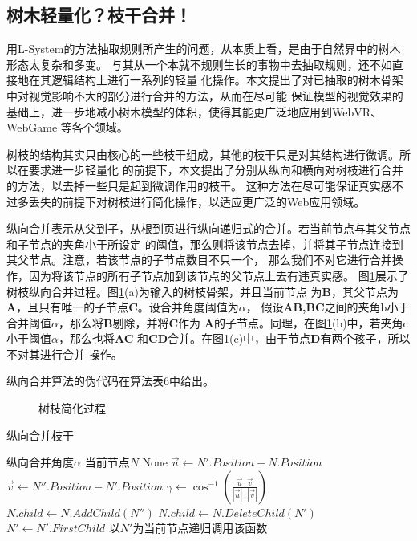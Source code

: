 \subsection{树木轻量化？枝干合并！}
\label{subsec:branchmerge}
用L-System的方法抽取规则所产生的问题，从本质上看，是由于自然界中的树木形态太复杂和多变。
与其从一个本就不规则生长的事物中去抽取规则，还不如直接地在其逻辑结构上进行一系列的轻量
化操作。本文提出了对已抽取的树木骨架中对视觉影响不大的部分进行合并的方法，从而在尽可能
保证模型的视觉效果的基础上，进一步地减小树木模型的体积，使得其能更广泛地应用到WebVR、WebGame
等各个领域。

树枝的结构其实只由核心的一些枝干组成，其他的枝干只是对其结构进行微调。所以在要求进一步轻量化
的前提下，本文提出了分别从纵向和横向对树枝进行合并的方法，以去掉一些只是起到微调作用的枝干。
这种方法在尽可能保证真实感不过多丢失的前提下对树枝进行简化操作，以适应更广泛的Web应用领域。

纵向合并表示从父到子，从根到页进行纵向递归式的合并。若当前节点与其父节点和子节点的夹角小于所设定
的阈值，那么则将该节点去掉，并将其子节点连接到其父节点。注意，若该节点的子节点数目不只一个，
那么我们不对它进行合并操作，因为将该节点的所有子节点加到该节点的父节点上去有违真实感。
图\ref{fig:vert}展示了树枝纵向合并过程。图\ref{fig:vert}(a)为输入的树枝骨架，并且当前节点
为\textbf{B}，其父节点为\textbf{A}，且只有唯一的子节点\textbf{C}。设合并角度阈值为$\alpha$，
假设\textbf{AB,BC}之间的夹角b小于合并阈值$\alpha$，那么将\textbf{B}剔除，并将\textbf{C}作为
\textbf{A}的子节点。同理，在图\ref{fig:vert}(b)中，若夹角c小于阈值$\alpha$，那么也将\textbf{AC}
和\textbf{CD}合并。在图\ref{fig:vert}(c)中，由于节点\textbf{D}有两个孩子，所以不对其进行合并
操作。

纵向合并算法的伪代码在算法表6中给出。

\begin{figure}[H]
	\centering
\hspace{4em}
\hspace{4em}
	\caption{树枝简化过程}
	\label{fig:vert}
\end{figure}

\begin{algorithm}[H]
	\caption{纵向合并枝干}
	\begin{algorithmic}[1]
		\Require 纵向合并角度$\alpha$
		\Require 当前节点$N$
		\Ensure None
		\State $\vec{u} \gets N'.Position-N.Position$
		\State $\vec{v} \gets N''.Position-N'.Position$
		\State $\gamma \gets \cos^{-1}({\frac{\vec{u} \cdot \vec{v}}{|\vec{u}|\cdot|\vec{v}|}})$
		\If{$\gamma<\alpha$}
		\State $N.child \gets N.AddChild(N'')$
		\State $N.child \gets N.DeleteChild(N') $
		\EndIf
		\State $N' \gets N'.FirstChild$
		\EndWhile
		\EndFor
		\State 以$N'$为当前节点递归调用该函数
		\EndFor
		\EndIf
	\end{algorithmic}
\end{algorithm}

